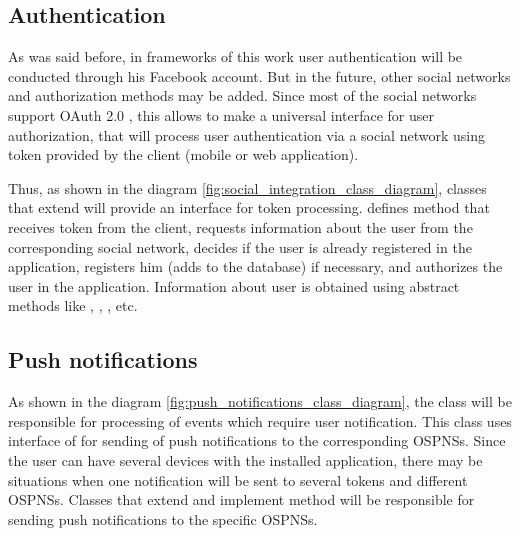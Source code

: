 \subsection{Authentication}
As was said before, in frameworks of this work user authentication will be conducted through his Facebook account. But in the future, other social networks and authorization methods may be added. Since most of the social networks support OAuth 2.0 \cite{oauth}, this allows to make a universal interface for user authorization, that will process user authentication via a social network using token provided by the client (mobile or web application).

Thus, as shown in the diagram \ref{fig:social_integration_class_diagram}, classes that extend  will provide an interface for token processing.  defines method  that receives token from the client, requests information about the user from the corresponding social network, decides if the user is already registered in the application, registers him (adds to the database) if necessary, and authorizes the user in the application. Information about user is obtained using abstract methods like , , , etc.



\subsection{Push notifications}
As shown in the diagram \ref{fig:push_notifications_class_diagram}, the  class will be responsible for processing of events which require user notification. This class uses interface of  for sending of push notifications to the corresponding \ac{OSPNS}s. Since the user can have several devices with the installed application, there may be situations when one notification will be sent to several tokens and different \ac{OSPNS}s. Classes that extend  and implement method  will be responsible for sending push notifications to the specific \ac{OSPNS}s.



